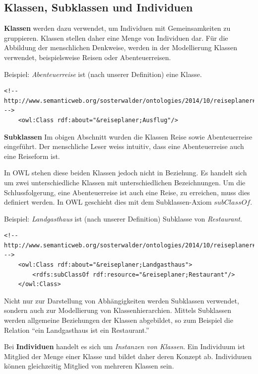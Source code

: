 \subsection{Klassen, Subklassen und Individuen}
\label{sec:owlRdf_owl_wissenModellieren_wichtigsteElemente_Classen}

\textbf{Klassen} werden dazu verwendet, um Individuen mit Gemeinsamkeiten zu gruppieren. Klassen stellen daher eine Menge von Individuen dar. Für die Abbildung der menschlichen Denkweise, werden in der Modellierung Klassen verwendet, beispielsweise Reisen oder Abenteuerreisen.

Beispiel: \textit{Abenteuerreise} ist (nach unserer Definition) eine Klasse.

\begin{lstlisting}[caption={Beispiel einer Klasse: Ausflüge}]
    <!-- http://www.semanticweb.org/sosterwalder/ontologies/2014/10/reiseplaner#Ausflug -->
    <owl:Class rdf:about="&reiseplaner;Ausflug"/>
\end{lstlisting}

\textbf{Subklassen}
Im obigen Abschnitt wurden die Klassen Reise sowie Abenteuerreise eingeführt. Der menschliche Leser weiss intuitiv, dass eine Abenteuerreise auch eine Reiseform ist.

In OWL stehen diese beiden Klassen jedoch nicht in Beziehung. Es handelt sich um zwei unterschiedliche Klassen mit unterschiedlichen Bezeichnungen. Um die Schlussfolgerung, eine Abenteuerreise ist auch eine Reise, zu erreichen, muss dies definiert werden. In OWL geschieht dies mit dem Subklassen-Axiom $subClassOf$.

Beispiel: \textit{Landgasthaus} ist (nach unserer Definition) Subklasse von \textit{Restaurant}.

\begin{lstlisting}[caption={Beispiel einer Subklasse}]
    <!-- http://www.semanticweb.org/sosterwalder/ontologies/2014/10/reiseplaner#Landgasthaus -->
    <owl:Class rdf:about="&reiseplaner;Landgasthaus">
        <rdfs:subClassOf rdf:resource="&reiseplaner;Restaurant"/>
    </owl:Class>
\end{lstlisting}
Nicht nur zur Darstellung von Abhängigkeiten werden Subklassen verwendet, sondern auch zur Modellierung von Klassenhierarchien. Mittels Subklassen werden allgemeine Beziehungen der Klassen abgebildet, so zum Beispiel die Relation ``ein Landgasthaus ist ein Restaurant.''

Bei \textbf{Individuen} handelt es sich um \textit{Instanzen von Klassen}. Ein Individuum ist Mitglied der Menge einer Klasse und bildet daher deren Konzept ab. Individuuen können gleichzeitig Mitglied von mehreren Klassen sein.

